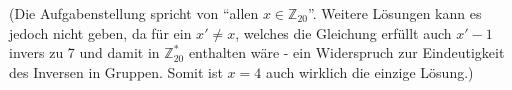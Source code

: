 \documentclass{scrreprt}
\begin{document}
\begin{enumerate}[(a)]
  (Die Aufgabenstellung spricht von ``allen $x \in \mathbb{Z}_{20}$''.
  Weitere Lösungen kann es jedoch nicht geben, da für ein $x' \ne x$, welches
  die Gleichung erfüllt auch $x' - 1$ invers zu 7 und damit in
  $\mathbb{Z}_{20}^*$ enthalten wäre - ein Widerspruch zur Eindeutigkeit des
  Inversen in Gruppen.
  Somit ist $x = 4$ auch wirklich die einzige Lösung.)
\end{enumerate}
\end{document}

